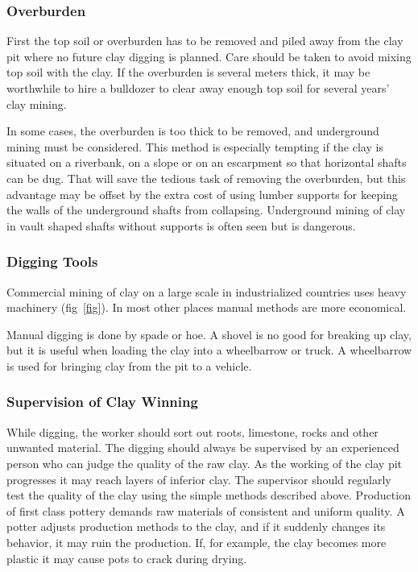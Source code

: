 \subsubsection{Overburden}
First the top soil or overburden has to be removed and piled away from the clay 
pit where no future clay digging is planned. Care should be taken to avoid 
mixing top soil with the clay. If the overburden is several meters thick, it 
may be worthwhile to hire a bulldozer to clear away enough top soil for several 
years' clay mining.

In some cases, the overburden is too thick to be removed, and underground 
mining must be considered. This method is especially tempting if the clay is 
situated on a riverbank, on a slope or on an escarpment so that horizontal 
shafts can be dug. That will save the tedious task of removing the overburden, 
but this advantage may be offset by the extra cost of using lumber supports for 
keeping the walls of the underground shafts from collapsing. Underground mining 
of clay in vault shaped shafts without supports is often seen but is dangerous.
\subsubsection{Digging Tools}
Commercial mining of clay on a large scale in industrialized countries uses 
heavy machinery (fig~\ref{fig}). In most other places manual methods are more 
economical.

Manual digging is done by spade or hoe. A shovel is no good for breaking up 
clay, but it is useful when loading the clay into a wheelbarrow or truck. A 
wheelbarrow is used for bringing clay from the pit to a vehicle.
\subsubsection{Supervision of Clay Winning}
While digging, the worker should sort out roots, limestone, rocks and other 
unwanted material. The digging should always be supervised by an experienced 
person who can judge the quality of the raw clay. As the working of the clay 
pit progresses it may reach layers of inferior clay. The supervisor should 
regularly test the quality of the clay using the simple methods described 
above. Production of first class pottery demands raw materials of 
consistent and uniform quality. A potter adjusts production methods to the 
clay, and if it suddenly changes its behavior, it may ruin the production. If, 
for example, the clay becomes more plastic it may cause pots to crack during 
drying.


